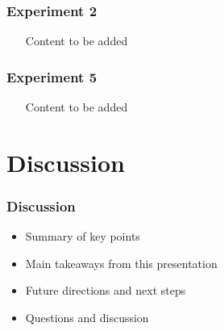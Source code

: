 \documentclass{beamer}
\begin{document}
\begin{frame}
\frametitle{Experiment 2}
\begin{itemize}
    \item [Content to be added]
\end{itemize}
\end{frame}

\begin{frame}
\frametitle{Experiment 5}
\begin{itemize}
    \item [Content to be added]
\end{itemize}
\end{frame}

\section{Discussion}
\begin{frame}
\frametitle{Discussion}
\begin{itemize}
    \item Summary of key points
    \item Main takeaways from this presentation
    \item Future directions and next steps
    \item Questions and discussion
\end{itemize}
\end{frame}
\end{document}
